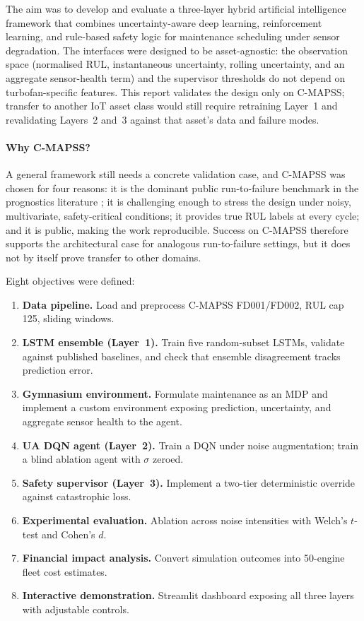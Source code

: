 \documentclass[12pt,a4paper]{report}
\begin{document}
The aim was to develop and evaluate a three-layer hybrid artificial intelligence framework that combines uncertainty-aware deep learning, reinforcement learning, and rule-based safety logic for maintenance scheduling under sensor degradation. The interfaces were designed to be asset-agnostic: the observation space (normalised RUL, instantaneous uncertainty, rolling uncertainty, and an aggregate sensor-health term) and the supervisor thresholds do not depend on turbofan-specific features. This report validates the design only on C-MAPSS; transfer to another IoT asset class would still require retraining Layer~1 and revalidating Layers~2 and~3 against that asset's data and failure modes.

\paragraph{Why C-MAPSS?} A general framework still needs a concrete validation case, and C-MAPSS was chosen for four reasons: it is the dominant public run-to-failure benchmark in the prognostics literature \citep{saxena2008damage}; it is challenging enough to stress the design under noisy, multivariate, safety-critical conditions; it provides true RUL labels at every cycle; and it is public, making the work reproducible. Success on C-MAPSS therefore supports the architectural case for analogous run-to-failure settings, but it does not by itself prove transfer to other domains.


Eight objectives were defined:

\begin{enumerate}\itemsep2pt
  \item \textbf{Data pipeline.} Load and preprocess C-MAPSS FD001/FD002, RUL cap 125, sliding windows.
  \item \textbf{LSTM ensemble (Layer~1).} Train five random-subset LSTMs, validate against published baselines, and check that ensemble disagreement tracks prediction error.
  \item \textbf{Gymnasium environment.} Formulate maintenance as an MDP and implement a custom environment exposing prediction, uncertainty, and aggregate sensor health to the agent.
  \item \textbf{UA DQN agent (Layer~2).} Train a DQN under noise augmentation; train a blind ablation agent with $\sigma$ zeroed.
  \item \textbf{Safety supervisor (Layer~3).} Implement a two-tier deterministic override against catastrophic loss.
  \item \textbf{Experimental evaluation.} Ablation across noise intensities with Welch's $t$-test and Cohen's $d$.
  \item \textbf{Financial impact analysis.} Convert simulation outcomes into 50-engine fleet cost estimates.
  \item \textbf{Interactive demonstration.} Streamlit dashboard exposing all three layers with adjustable controls.
\end{enumerate}
\end{document}
